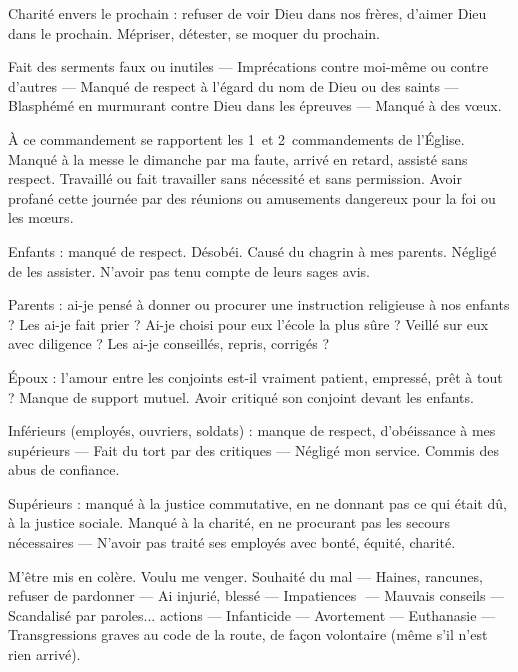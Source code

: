 Charité envers le prochain : refuser de
voir Dieu dans nos frères, d’aimer Dieu
dans le prochain. Mépriser, détester, se
moquer du prochain.


Fait des serments faux ou inutiles — Imprécations contre moi-même ou contre
d’autres — Manqué de respect à l’égard
du nom de Dieu ou des saints — Blasphémé en murmurant contre Dieu dans
les épreuves — Manqué à des vœux.


À ce commandement se rapportent les 1\ier\ et 2\ieme\ commandements de l’Église.
Manqué à la messe le dimanche par ma faute, arrivé
en retard, assisté sans respect. Travaillé
ou fait travailler sans nécessité et sans
permission. Avoir profané
cette journée par des réunions ou amusements dangereux pour la foi ou les
mœurs.


Enfants : manqué de respect. Désobéi.
Causé du chagrin à mes parents. Négligé
de les assister. N’avoir pas tenu compte de
leurs sages avis.

Parents : ai-je pensé à donner ou procurer
une instruction religieuse à nos enfants ?
Les ai-je fait prier ? Ai-je choisi pour eux
l’école la plus sûre ? Veillé sur eux avec
diligence ? Les ai-je conseillés, repris,
corrigés ?

Époux : l’amour entre les conjoints est-il
vraiment patient, empressé, prêt à tout ?
Manque de support mutuel. Avoir critiqué
son conjoint devant les enfants.

Inférieurs (employés, ouvriers, soldats) :
manque de respect, d’obéissance à mes
supérieurs — Fait du tort par des critiques
— Négligé mon service. Commis des abus
de confiance.

Supérieurs : manqué à la justice commutative, en ne donnant pas ce qui était dû, à
la justice sociale. Manqué à la charité, en
ne procurant pas les secours nécessaires
— N’avoir pas traité ses employés avec
bonté, équité, charité.


M’être mis en colère. Voulu me venger.
Souhaité du mal — Haines, rancunes, refuser de pardonner — Ai injurié, blessé
— Impatiences ­ — Mauvais conseils —
Scandalisé par paroles... actions — Infanticide — Avortement — Euthanasie —
Transgressions graves au code de la route,
de façon volontaire (même s’il n’est rien
arrivé).

